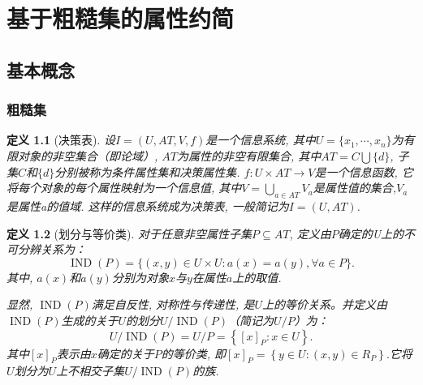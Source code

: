 \chapter{基于粗糙集的属性约简}
\label{chapter:0105}
\section{基本概念}
\label{section:粗糙集基本概念}
\subsection{粗糙集}
\newtheorem{Definition}{\hspace{2em}定义}[chapter]
\begin{Definition}[决策表]\cite{2009New}
设$I=(U,AT,V,f)$是一个信息系统, 其中$U=\{x_1,\cdots,x_n\}$为有限对象的非空集合（即论域）, $AT$为属性的非空有限集合, 其中$AT=C\bigcup \{d\}$, 子集$C$和$\{d\}$分别被称为条件属性集和决策属性集. $f:U \times  AT \rightarrow V$是一个信息函数, 它将每个对象的每个属性映射为一个信息值, 其中$V=\bigcup_{a \in AT} V_{a}$是属性值的集合,$V_{a}$是属性a的值域. 这样的信息系统成为决策表, 一般简记为$I=(U,AT)$.
\end{Definition}
\begin{Definition}[划分与等价类]\cite{gu2014knowledge}
对于任意非空属性子集$P \subseteq AT$, 定义由$P$确定的U上的不可分辨关系为：
$$\operatorname{IND}(P)=\{(x, y) \in U \times U: a(x)=a(y), \forall a \in P\}.$$
其中, $a(x)$和$a(y)$分别为对象$x$与$y$在属性$a$上的取值.

显然, $\operatorname{IND}(P)$满足自反性, 对称性与传递性, 是$U$上的等价关系。并定义由$\operatorname{IND}(P)$生成的关于$U$的划分$U/\operatorname{IND}(P)$（简记为$U/P$）为：
$$U/\operatorname{IND}(P)=U/P=\left\{[x]_{P}: x \in U\right\}.$$
其中$[x]_{P}$表示由$x$确定的关于$P$的等价类, 即$[x]_{P}=\left\{y \in U:(x, y) \in R_{P}\right\}.$它将$U$划分为$U$上不相交子集$U/\operatorname{IND}(P)$的族.
\end{Definition}

